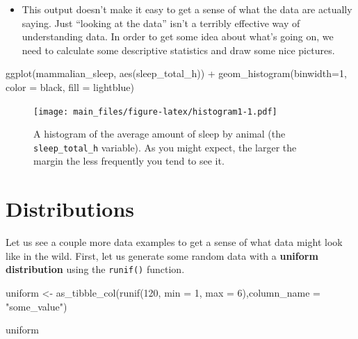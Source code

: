 \documentclass[
]{book}
\newenvironment{Shaded}{\begin{snugshade}}{\end{snugshade}}
\newcommand{\AttributeTok}[1]{\textcolor[rgb]{0.77,0.63,0.00}{#1}}
\newcommand{\DecValTok}[1]{\textcolor[rgb]{0.00,0.00,0.81}{#1}}
\newcommand{\FunctionTok}[1]{\textcolor[rgb]{0.00,0.00,0.00}{#1}}
\newcommand{\NormalTok}[1]{#1}
\newcommand{\OtherTok}[1]{\textcolor[rgb]{0.56,0.35,0.01}{#1}}
\newcommand{\SpecialCharTok}[1]{\textcolor[rgb]{0.00,0.00,0.00}{#1}}
\newcommand{\StringTok}[1]{\textcolor[rgb]{0.31,0.60,0.02}{#1}}
\providecommand{\tightlist}{%
  \setlength{\itemsep}{0pt}\setlength{\parskip}{0pt}}
\begin{document}
\begin{itemize}
\tightlist
\item
  This output doesn't make it easy to get a sense of what the data are actually saying. Just ``looking at the data'' isn't a terribly effective way of understanding data. In order to get some idea about what's going on, we need to calculate some descriptive statistics and draw some nice pictures.
\end{itemize}

\begin{Shaded}
\begin{Highlighting}[]
\FunctionTok{ggplot}\NormalTok{(mammalian\_sleep, }\FunctionTok{aes}\NormalTok{(sleep\_total\_h)) }\SpecialCharTok{+}
        \FunctionTok{geom\_histogram}\NormalTok{(}\AttributeTok{binwidth=}\DecValTok{1}\NormalTok{,}
                       \AttributeTok{color =} \StringTok{\textquotesingle{}black\textquotesingle{}}\NormalTok{,}
                       \AttributeTok{fill =} \StringTok{\textquotesingle{}lightblue\textquotesingle{}}\NormalTok{)}
\end{Highlighting}
\end{Shaded}

\begin{figure}
\centering
\texttt{[image: main\_files/figure-latex/histogram1-1.pdf]}
\caption{\label{fig:histogram1}A histogram of the average amount of sleep by animal (the \texttt{sleep\_total\_h} variable). As you might expect, the larger the margin the less frequently you tend to see it.}
\end{figure}

\hypertarget{distributions}{%
\section{Distributions}\label{distributions}}

Let us see a couple more data examples to get a sense of what data might look like in the wild. First, let us generate some random data with a \textbf{uniform distribution} using the \texttt{runif()} function.

\begin{Shaded}
\begin{Highlighting}[]
\NormalTok{uniform }\OtherTok{\textless{}{-}} \FunctionTok{as\_tibble\_col}\NormalTok{(}\FunctionTok{runif}\NormalTok{(}\DecValTok{120}\NormalTok{, }\AttributeTok{min =} \DecValTok{1}\NormalTok{, }\AttributeTok{max =} \DecValTok{6}\NormalTok{),}\AttributeTok{column\_name =} \StringTok{"some\_value"}\NormalTok{)}

\NormalTok{uniform}
\end{Highlighting}
\end{Shaded}
\end{document}
